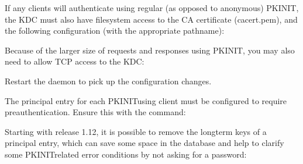 \documentclass[letterpaper,10pt,english]{sphinxmanual}
\begin{document}
\begin{sphinxVerbatim}[commandchars=\\\{\}]
  
\end{sphinxVerbatim}

\sphinxAtStartPar
If any clients will authenticate using regular (as opposed to
anonymous) PKINIT, the KDC must also have filesystem access to the CA
certificate (cacert.pem), and the following configuration (with the
appropriate pathname):

\begin{sphinxVerbatim}[commandchars=\\\{\}]
  
\end{sphinxVerbatim}

\sphinxAtStartPar
Because of the larger size of requests and responses using PKINIT, you
may also need to allow TCP access to the KDC:

\begin{sphinxVerbatim}[commandchars=\\\{\}]
  
\end{sphinxVerbatim}

\sphinxAtStartPar
Restart the {\hyperref[\detokenize{admin/admin_commands/krb5kdc:krb5kdc-8}]{}} daemon to pick up the configuration
changes.

\sphinxAtStartPar
The principal entry for each PKINIT\sphinxhyphen{}using client must be configured to
require preauthentication.  Ensure this with the command:

\begin{sphinxVerbatim}[commandchars=\\\{\}]
  
\end{sphinxVerbatim}

\sphinxAtStartPar
Starting with release 1.12, it is possible to remove the long\sphinxhyphen{}term
keys of a principal entry, which can save some space in the database
and help to clarify some PKINIT\sphinxhyphen{}related error conditions by not asking
for a password:
\end{document}
